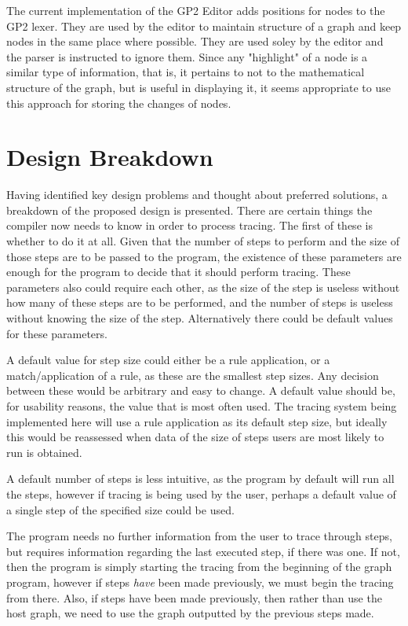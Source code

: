\documentclass{UoYCSproject}
\begin{document}
The current implementation of the GP2 Editor adds positions for nodes to the GP2 lexer. They are used by the editor to maintain structure of a graph and keep nodes in the same place where possible. They are used soley by the editor and the parser is instructed to ignore them. Since any "highlight" of a node is a similar type of information, that is, it pertains to not to the mathematical structure of the graph, but is useful in displaying it, it seems appropriate to use this approach for storing the changes of nodes.

\section{Design Breakdown}

Having identified key design problems and thought about preferred solutions, a breakdown of the proposed design is presented. There are certain things the compiler now needs to know in order to process tracing. The first of these is whether to do it at all. Given that the number of steps to perform and the size of those steps are to be passed to the program, the existence of these parameters are enough for the program to decide that it should perform tracing. These parameters also could require each other, as the size of the step is useless without how many of these steps are to be performed, and the number of steps is useless without knowing the size of the step. Alternatively there could be default values for these parameters. 

A default value for step size could either be a rule application, or a match/application of a rule, as these are the smallest step sizes. Any decision between these would be arbitrary and easy to change. A default value should be, for usability reasons, the value that is most often used. The tracing system being implemented here will use a rule application as its default step size, but ideally this would be reassessed when data of the size of steps users are most likely to run is obtained.

A default number of steps is less intuitive, as the program by default will run all the steps, however if tracing is being used by the user, perhaps a default value of a single step of the specified size could be used. 

The program needs no further information from the user to trace through steps, but requires information regarding the last executed step, if there was one. If not, then the program is simply starting the tracing from the beginning of the graph program, however if steps \emph{have} been made previously, we must begin the tracing from there. Also, if steps have been made previously, then rather than use the host graph, we need to use the graph outputted by the previous steps made. 
\end{document}
